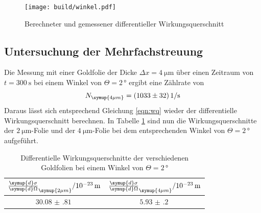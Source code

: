 \begin{figure}[H]
  \centering
  \texttt{[image: build/winkel.pdf]}
  \caption{Berechneter und gemessener differentieller Wirkungsquerschnitt}
  \label{fig:wirkungsquerschnitt}
\end{figure}


\subsection{Untersuchung der Mehrfachstreuung}
Die Messung mit einer Goldfolie der Dicke $\Delta x = \SI{4}{\micro\meter}$ über einen
Zeitraum von $t = \SI{300}{\second}$ bei einem Winkel von $\Theta = 2 \, °$ ergibt
eine Zählrate von
\begin{equation*}
  N_\symup{4\mu m} = \SI{1033(32)}{1\per\second}
\end{equation*}
Daraus lässt sich entsprechend Gleichung \ref{eqn:wq} wieder der differentielle Wirkungsquerschnitt
berechnen. In Tabelle \ref{tab:wq} sind nun die Wirkungsquerschnitte der $\SI{2}{\micro\meter}$-Folie
und der $\SI{4}{\micro\meter}$-Folie bei dem entsprechenden Winkel von $\Theta = 2 \, °$ aufgeführt.
\begin{table}[H]
  \centering
  \caption{Differentielle Wirkungsquerschnitte der verschiedenen Goldfolien bei einem Winkel von $\Theta = 2 \, °$}
  \label{tab:wq}
  \begin{tabular}{c c}
    \toprule
    $\frac{\symup{d}\sigma}{\symup{d}\Omega}_\symup{2\mu m} /  10^{-23}\, \mathrm{m}$ & $\frac{\symup{d}\sigma}{\symup{d}\Omega}_\symup{4\mu m}/ 10^{-23}\, \mathrm{m}$ \\
    \midrule
    $\SI{30.08(81)}{}$ & $\SI{5.93(20)}{}$  \\
    \bottomrule
  \end{tabular}
\end{table}


